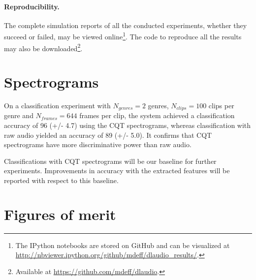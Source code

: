 \paragraph{Reproducibility.}
The complete simulation reports of all the conducted experiments, whether they succeed or failed, may be viewed online\footnote{The IPython notebooks are stored on GitHub and can be visualized at \url{http://nbviewer.ipython.org/github/mdeff/dlaudio_results/}.}.
The code to reproduce all the results may also be downloaded\footnote{Available at \url{https://github.com/mdeff/dlaudio}.}.

\section{Spectrograms} \label{sec:spectrograms}

On a classification experiment with $N_{genres} = 2$ genres, $N_{clips} = 100$ clips per genre and $N_{frames} = 644$ frames per clip, the system achieved a classification accuracy of 96 (+/- 4.7) using the \gls{CQT} spectrograms, whereas classification with raw audio yielded an accuracy of 89 (+/- 5.0). It confirms that \gls{CQT} spectrograms have more discriminative power than raw audio.

Classifications with \gls{CQT} spectrograms will be our baseline for further experiments. Improvements in accuracy with the extracted features will be reported with respect to this baseline.


\section{Figures of merit}

